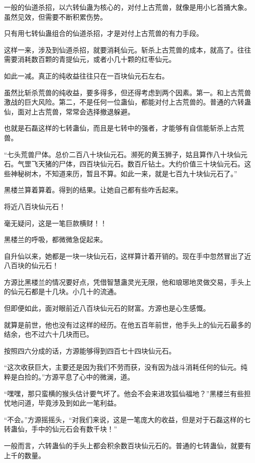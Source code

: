 \begin{this_body}
一般的仙道杀招，以六转仙蛊为核心的，对付上古荒兽，就像是用小匕首捅大象。虽然见效，但需要不断积累伤势。

只有用七转仙蛊组合的仙道杀招，才是对付上古荒兽的有力手段。

这样一来，涉及到仙道杀招，就要消耗仙元。斩杀上古荒兽的成本，就高了。往往需要消耗数百颗的青提仙元，或者小几十颗的红枣仙元。

如此一减。真正的纯收益往往只在一百块仙元石左右。

虽然比斩杀荒兽的纯收益，要多得多，但还得考虑到两个因素。第一。和上古荒兽激战的巨大风险。第二，不是任何一位蛊仙，都能对付上古荒兽的。普通的六转蛊仙，面对上古荒兽，常常会选择撤退躲避。

也就是石磊这样的七转蛊仙，而且是七转中的强者，才能够有自信能斩杀上古荒兽。

“七头荒兽尸体。总价二百八十块仙元石。濒死的黄玉狮子，姑且算作八十块仙元石。气罡飞天猪的尸体，四百块仙元石。数百斤钻土。大约价值三十块仙元石。这些神秘树木，不知道来历，暂且不算。如此一来，就是七百九十块仙元石了。”

黑楼兰算着算着。得到的结果。让她自己都有些咋舌起来。

将近八百块仙元石！

毫无疑问，这是一笔巨款横财！！

黑楼兰的呼吸，都微微急促起来。

自升仙以来，她都是一块一块仙元石，这样算计着开销的。现在手中忽然冒出了近八百块的仙元石！

方源比黑楼兰的情况要好点，凭借智慧蛊灵光无限，他和琅琊地灵做交易，手头上的仙元石都是十几块。小几十的流通。

但即便如此，面对眼前近八百块仙元石的财富。方源也是心生感慨。

就算是前世，他也没有过这样的经历。在他五百年前世，他手头上的仙元石最多的结余，也不过六十几块而已。

按照四六分成的话，方源能够得到四百七十四块仙元石。

“这次收获巨大，主要还是因为我们不劳而获，没有因为战斗消耗任何的仙元。纯粹是白捡的。”方源平息了心中的微澜，道。

“嘿嘿，那只蛮横的猴头估计要气坏了。他会不会来进攻狐仙福地？”黑楼兰有些担忧地问道，毕竟涉及到如此一笔利益。

“不会。”方源摇摇头，“对我们来说，这是一笔庞大的收益，但是对于石磊这样的七转蛊仙，手中的仙元石会有数千块！”

一般而言，六转蛊仙的手头上都会积余数百块仙元石的。普通的七转蛊仙，就要有上千的数量。


\end{this_body}
